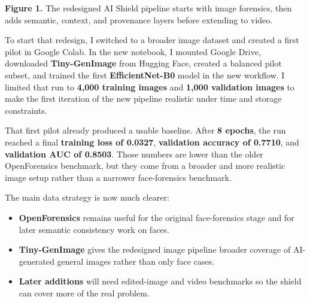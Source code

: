 \documentclass[11pt]{article}
\begin{document}
\begin{center}

\small\textbf{Figure 1.} The redesigned AI Shield pipeline starts with image forensics, then adds semantic, context, and provenance layers before extending to video.
\end{center}

To start that redesign, I switched to a broader image dataset and created a first pilot in Google Colab. In the new notebook, I mounted Google Drive, downloaded \textbf{Tiny-GenImage} from Hugging Face, created a balanced pilot subset, and trained the first \textbf{EfficientNet-B0} model in the new workflow. I limited that run to \textbf{4,000 training images} and \textbf{1,000 validation images} to make the first iteration of the new pipeline realistic under time and storage constraints.

That first pilot already produced a usable baseline. After \textbf{8 epochs}, the run reached a final \textbf{training loss of 0.0327}, \textbf{validation accuracy of 0.7710}, and \textbf{validation AUC of 0.8503}. Those numbers are lower than the older OpenForensics benchmark, but they come from a broader and more realistic image setup rather than a narrower face-forensics benchmark.

The main data strategy is now much clearer:
\begin{itemize}[leftmargin=1.5em]
    \item \textbf{OpenForensics} remains useful for the original face-forensics stage and for later semantic consistency work on faces.
    \item \textbf{Tiny-GenImage} gives the redesigned image pipeline broader coverage of AI-generated general images rather than only face cases.
    \item \textbf{Later additions} will need edited-image and video benchmarks so the shield can cover more of the real problem.
\end{itemize}
\end{document}
